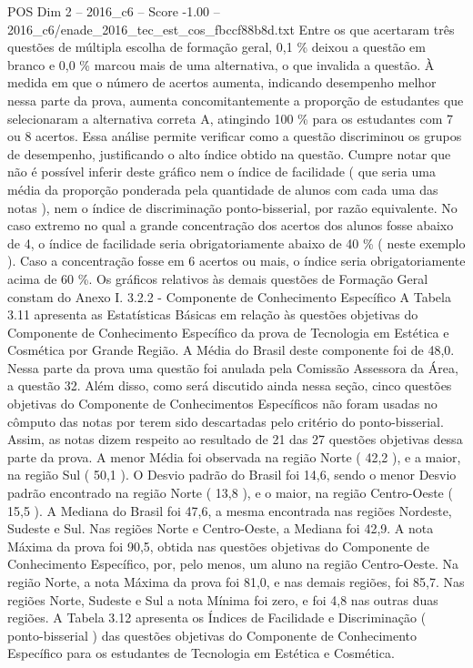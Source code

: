\begin{textsample}{POS Dim 2 – 2016\_c6 – Score -1.00 – 2016\_c6/enade\_2016\_tec\_est\_cos\_fbccf88b8d.txt}
Entre os que acertaram três questões de múltipla escolha de formação geral, 0,1 \% deixou a questão em branco e 0,0 \% marcou mais de uma alternativa, o que invalida a questão.
À medida em que o número de acertos aumenta, indicando desempenho melhor nessa parte da prova, aumenta concomitantemente a proporção de estudantes que selecionaram a alternativa correta A, atingindo 100 \% para os estudantes com 7 ou 8 acertos.
Essa análise permite verificar como a questão discriminou os grupos de desempenho, justificando o alto índice obtido na questão.
Cumpre notar que não é possível inferir deste gráfico nem o índice de facilidade ( que seria uma média da proporção ponderada pela quantidade de alunos com cada uma das notas ), nem o índice de discriminação ponto-bisserial, por razão equivalente.
No caso extremo no qual a grande concentração dos acertos dos alunos fosse abaixo de 4, o índice de facilidade seria obrigatoriamente abaixo de 40 \% ( neste exemplo ).
Caso a concentração fosse em 6 acertos ou mais, o índice seria obrigatoriamente acima de 60 \%.
Os gráficos relativos às demais questões de Formação Geral constam do Anexo I. 3.2.2 - Componente de Conhecimento Específico A Tabela 3.11 apresenta as Estatísticas Básicas em relação às questões objetivas do Componente de Conhecimento Específico da prova de Tecnologia em Estética e Cosmética por Grande Região.
A Média do Brasil deste componente foi de 48,0.
Nessa parte da prova uma questão foi anulada pela Comissão Assessora da Área, a questão 32.
Além disso, como será discutido ainda nessa seção, cinco questões objetivas do Componente de Conhecimentos Específicos não foram usadas no cômputo das notas por terem sido descartadas pelo critério do ponto-bisserial.
Assim, as notas dizem respeito ao resultado de 21 das 27 questões objetivas dessa parte da prova.
A menor Média foi observada na região Norte ( 42,2 ), e a maior, na região Sul ( 50,1 ).
O Desvio padrão do Brasil foi 14,6, sendo o menor Desvio padrão encontrado na região Norte ( 13,8 ), e o maior, na região Centro-Oeste ( 15,5 ).
A Mediana do Brasil foi 47,6, a mesma encontrada nas regiões Nordeste, Sudeste e Sul.
Nas regiões Norte e Centro-Oeste, a Mediana foi 42,9.
A nota Máxima da prova foi 90,5, obtida nas questões objetivas do Componente de Conhecimento Específico, por, pelo menos, um aluno na região Centro-Oeste.
Na região Norte, a nota Máxima da prova foi 81,0, e nas demais regiões, foi 85,7.
Nas regiões Norte, Sudeste e Sul a nota Mínima foi zero, e foi 4,8 nas outras duas regiões.
A Tabela 3.12 apresenta os Índices de Facilidade e Discriminação ( ponto-bisserial ) das questões objetivas do Componente de Conhecimento Específico para os estudantes de Tecnologia em Estética e Cosmética.

\end{textsample}
